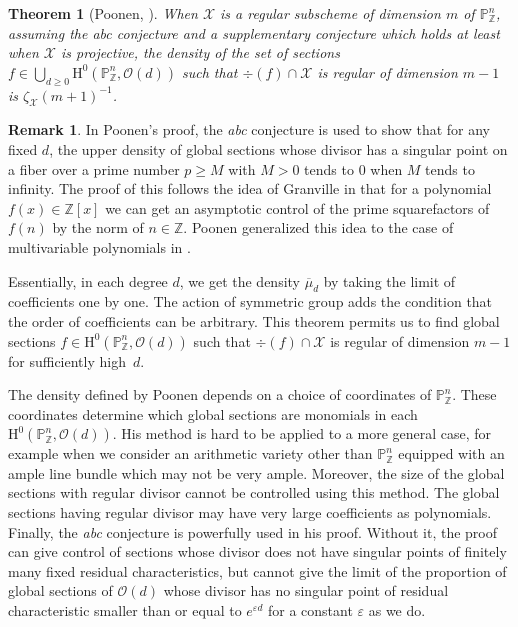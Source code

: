 \documentclass[11pt]{article}
\numberwithin{equation}{section}
\theoremstyle{plain}
\newtheorem{thm}{Theorem}[section]
\theoremstyle{definition}
\newtheorem*{rmq}{Remark}
\newcommand{\ho}{\mathrm{H}}
\newcommand{\X}{\mathcal{X}}
\newcommand{\Z}{\mathbb{Z}}
\newcommand{\pr}{\mathbb{P}}
\begin{document}
\begin{thm}[Poonen, {\cite[Th.\,5.1]{Po04}}]\label{poonen}
When $\X$ is a regular subscheme of dimension $m$ of $\pr^n_{\Z}$, assuming the \emph{abc} conjecture and a supplementary conjecture which holds at least when $\X$ is projective, the density of the set of sections $f\in \bigcup_{d\geq 0}\ho^0(\pr^n_{\Z}, \mathcal{O}(d))$ such that $\div (f)\cap \X$ is regular of dimension $m-1$ is $\zeta_{\X}(m+1)^{-1}$.
\end{thm}

\begin{rmq}
In Poonen's proof, the \emph{abc} conjecture is used to show that for any fixed $d$, the upper density of global sections whose divisor has a singular point on a fiber over a prime number $p\geq M$ with $M>0$ tends to $0$ when $M$ tends to infinity. The proof of this follows the idea of Granville in \cite{Gr98} that for a polynomial $f(x)\in \Z[x]$ we can get an asymptotic control of the prime squarefactors of $f(n)$ by the norm of $n\in \Z$. Poonen generalized this idea to the case of multivariable polynomials in \cite{Po03}.
\end{rmq}

Essentially, in each degree $d$, we get the density $\overline{\mu}_d$ by taking the limit of coefficients one by one. The action of symmetric group adds the condition that the order of coefficients can be arbitrary. This theorem permits us to find global sections $f\in\ho^0(\pr^n_{\Z}, \mathcal{O}(d))$ such that $\div (f)\!\cap\!\X$ is regular of dimension $m\!-\!1$ for sufficiently high~$d$.

The density defined by Poonen depends on a choice of coordinates of $\pr^n_{\Z}$. These coordinates determine which global sections are monomials in each $\ho^0(\pr^n_{\Z}, \mathcal{O}(d))$. His method is hard to be applied to a more general case, for example when we consider an arithmetic variety other than $\pr^n_{\Z}$ equipped with an ample line bundle which may not be very ample. Moreover, the size of the global sections with regular divisor cannot be controlled using this method. The global sections having regular divisor may have very large coefficients as polynomials. Finally, the \emph{abc} conjecture is powerfully used in his proof. Without it, the proof can give control of sections whose divisor does not have singular points of finitely many fixed residual characteristics, but cannot give the limit of the proportion of global sections of $\mathcal{O}(d)$ whose divisor has no singular point of residual characteristic smaller than or equal to $e^{\varepsilon d}$ for a constant $\varepsilon $ as we do.
\end{document}
